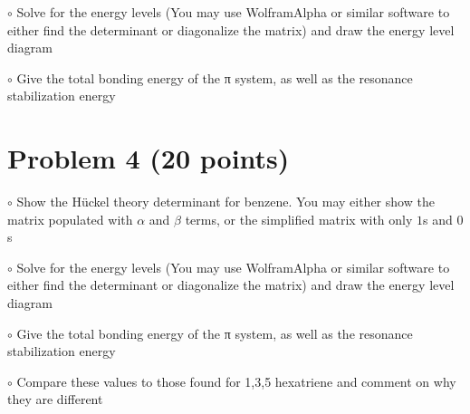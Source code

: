 \documentclass[10pt, letterpaper]{memoir}
\begin{document}
	\vspace{25em}
	
	\noindent$\circ$ Solve for the energy levels (You may use WolframAlpha or similar software to either find the determinant or diagonalize the matrix) and draw the energy level diagram
	
	\vspace{15em}
	\noindent $\circ$ Give the total bonding energy of the π system, as well as the resonance stabilization energy
	
	\newpage
	\section*{Problem 4 (20 points)}
		$\circ$ Show the H\"uckel theory determinant for benzene. You may either show the matrix populated with $\alpha$ and $\beta$ terms, or the simplified matrix with only $1$s and $0$s
	
	\vspace{25em}
	
	\noindent$\circ$ Solve for the energy levels (You may use WolframAlpha or similar software to either find the determinant or diagonalize the matrix) and draw the energy level diagram
	
	\vspace{15em}
	\noindent $\circ$ Give the total bonding energy of the π system, as well as the resonance stabilization energy
	
	\vspace{5em}
	\noindent $\circ$ Compare these values to those found for 1,3,5 hexatriene and comment on why they are different
\end{document}
